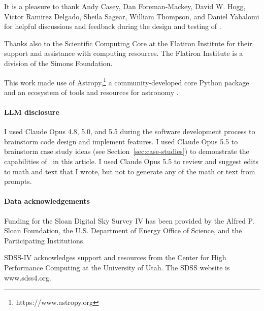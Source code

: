 \documentclass[twocolumn]{AASTeX7/aastex701}
\newcommand{\harv}{\package{harv}}
\begin{document}
\begin{acknowledgments}

  It is a pleasure to thank
  Andy Casey,
  Dan Foreman-Mackey,
  David W. Hogg,
  Victor Ramirez Delgado,
  Sheila Sagear,
  William Thompson,
  and Daniel Yahalomi
  for helpful discussions and feedback during the design and testing of \harv.

  Thanks also to the Scientific Computing Core at the Flatiron Institute for their
  support and assistance with computing resources.
  The Flatiron Institute is a division of the Simons Foundation.

  This work made use of Astropy,\footnote{https://www.astropy.org} a community-developed
  core Python package and an ecosystem of tools and resources for astronomy
  \citep{astropy:2013, astropy:2018, astropy:2022}.

  \paragraph{LLM disclosure}
  I used Claude Opus 4.8, 5.0, and 5.5 during the software development process to
  brainstorm code design and implement features.
  I used Claude Opus 5.5 to brainstorm case study ideas (see
  Section~\ref{sec:case-studies}) to demonstrate the capabilities of \harv\ in this
  article.
  I used Claude Opus 5.5 to review and suggest edits to math and text that I wrote, but
  not to generate any of the math or text from prompts.

  \paragraph{Data acknowledgements}
  Funding for the Sloan Digital Sky Survey IV has been provided by the Alfred P. Sloan
  Foundation, the U.S. Department of Energy Office of Science, and the Participating
  Institutions.

  SDSS-IV acknowledges support and resources from the Center for High Performance
  Computing  at the University of Utah. The SDSS website is www.sdss4.org.


\end{acknowledgments}
\end{document}
